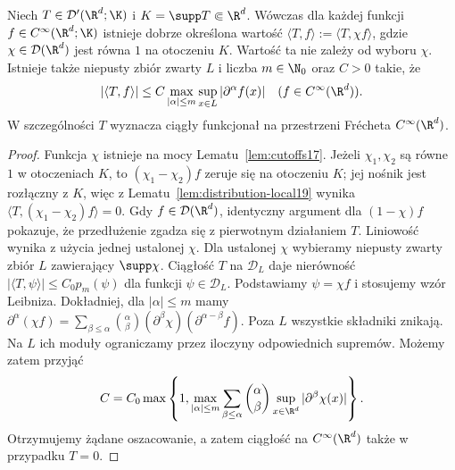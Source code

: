 \begin{lemat}
\label{lem:compact-action21}
Niech $T\in\mathcal D'(\R^d;\K)$ i
$K=\supp T\Subset\R^d$. Wówczas dla każdej funkcji
$f\in C^\infty(\R^d;\K)$ istnieje dobrze określona wartość
$\langle T,f\rangle:=\langle T,\chi f\rangle$, gdzie
$\chi\in\mathcal D(\R^d)$ jest równa $1$ na otoczeniu $K$.
Wartość ta nie zależy od wyboru $\chi$. Istnieje także
niepusty zbiór zwarty $L$ i liczba $m\in\N_0$ oraz $C>0$ takie, że
\[
 |\langle T,f\rangle|\le
 C\max_{|\alpha|\le m}\sup_{x\in L}|\partial^\alpha f(x)|
 \quad(f\in C^\infty(\R^d)).
\]
W szczególności $T$ wyznacza ciągły funkcjonał na
przestrzeni Frécheta $C^\infty(\R^d)$.
\end{lemat}
\begin{proof}
Funkcja $\chi$ istnieje na mocy Lematu~\ref{lem:cutoffs17}.
Jeżeli $\chi_1,\chi_2$ są równe $1$ w otoczeniach $K$,
to $(\chi_1-\chi_2)f$ zeruje się na otoczeniu $K$;
jej nośnik jest rozłączny z $K$, więc z Lematu~\ref{lem:distribution-local19}
wynika $\langle T,(\chi_1-\chi_2)f\rangle=0$.
Gdy $f\in\mathcal D(\R^d)$, identyczny argument dla
$(1-\chi)f$ pokazuje, że przedłużenie zgadza się z pierwotnym
działaniem $T$. Liniowość wynika z użycia jednej ustalonej $\chi$.
Dla ustalonej $\chi$ wybieramy niepusty zwarty zbiór $L$
zawierający $\supp\chi$.
Ciągłość $T$ na $\mathcal D_L$ daje nierówność
$|\langle T,\psi\rangle|\le C_0p_m(\psi)$ dla funkcji
$\psi\in\mathcal D_L$. Podstawiamy $\psi=\chi f$
i stosujemy wzór Leibniza. Dokładniej, dla $|\alpha|\le m$ mamy
$\partial^\alpha(\chi f)=\sum_{\beta\le\alpha}
\binom\alpha\beta(\partial^\beta\chi)(\partial^{\alpha-\beta}f)$.
Poza $L$ wszystkie składniki znikają. Na $L$ ich moduły
ograniczamy przez iloczyny odpowiednich supremów.
Możemy zatem przyjąć
\[
 C=C_0\max\left\{1,\max_{|\alpha|\le m}
 \sum_{\beta\le\alpha}\binom\alpha\beta
 \sup_{x\in\R^d}|\partial^\beta\chi(x)|\right\}.
\]
Otrzymujemy żądane oszacowanie, a zatem ciągłość na
$C^\infty(\R^d)$ także w przypadku $T=0$.
\end{proof}

